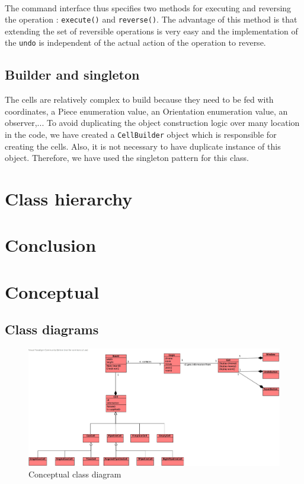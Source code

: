 \documentclass[a4paper,11pt]{article}
\begin{document}
\paragraph{}
The command interface thus specifies two methods for executing and reversing the operation : \texttt{execute()} and \texttt{reverse()}. The advantage of this method is that extending the set of reversible operations is very easy and the implementation of the \texttt{undo} is independent of the actual action of the operation to reverse. 
\subsection{Builder and singleton}
The cells are relatively complex to build because they need to be fed with coordinates, a Piece enumeration value, an Orientation enumeration value, an observer,... To avoid duplicating the object construction logic over many location in the code, we have created a \texttt{CellBuilder} object which is responsible for creating the cells. Also, it is not necessary to have duplicate instance of this object. Therefore, we have used the singleton pattern for this class.
\label{sec:patterns}
\section{Class hierarchy}
\label{sec:cls_hier}
\section{Conclusion}
\appendix
\section{Conceptual}
\subsection{Class diagrams}
\begin{figure}[h]
	\center
	\includegraphics[angle=90,scale=0.8]{Conceptual-Class-diagram.png}
	\caption{Conceptual class diagram}
	\label{fig:concept-class}
\end{figure}
\end{document}
